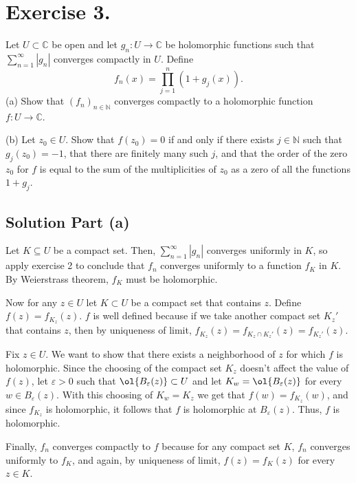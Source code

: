 
\section{Exercise 3.}

Let \(U \subset \mathbb{C}\) be open and let \(g_n : U \to \mathbb{C}\) be holomorphic functions such that \(\sum_{n=1}^{\infty} |g_n|\) converges compactly in \(U\). Define
\[
f_n(x) = \prod_{j=1}^{n} (1 + g_j(x)).
\]
(a) Show that \((f_n)_{n \in \mathbb{N}}\) converges compactly to a holomorphic function \(f : U \to \mathbb{C}\).

(b) Let \(z_0 \in U\). Show that \(f(z_0) = 0\) if and only if there exists \(j \in \mathbb{N}\) such that \(g_j(z_0) = -1\), that there are finitely many such \(j\), and that the order of the zero \(z_0\) for \(f\) is equal to the sum of the multiplicities of \(z_0\) as a zero of all the functions \(1 + g_j\).

\subsection*{Solution Part (a)}

Let $K \subseteq U$ be a compact set. Then, $\sum_{n = 1}^{\infty}|g_n|$ converges uniformly in $K$, so apply exercise 2 to conclude that $f_n$ converges uniformly to a function $f_K$ in $K$. By Weierstrass theorem, $f_K$ must be holomorphic.

Now for any $z \in U$ let $K \subset U$ be a compact set that contains $z$. Define $f(z) = f_{K_z}(z)$. $f$ is well defined because if we take another compact set $K_z'$ that contains $z$, then by uniqueness of limit, $f_{K_z}(z) = f_{K_z\cap K_z'}(z) = f_{K_z'}(z)$.

Fix $z \in U$. We want to show that there exists a neighborhood of $z$ for which $f$ is holomorphic. Since the choosing of the compact set $K_z$ doesn't affect the value of $f(z)$, let $\varepsilon > 0$ such that $\ol{B_{\varepsilon}(z)} \subset U$ and let $K_w = \ol{B_{\varepsilon }(z)}$ for every $w \in B_{\varepsilon}(z)$. With this choosing of $K_w = K_z$ we get that $f(w) = f_{K_z}(w)$, and since $f_{K_z}$ is holomorphic, it follows that $f$ is holomorphic at $B_\varepsilon(z)$. Thus, $f$ is holomorphic.

Finally, $f_n$ converges compactly to $f$ because for any compact set $K$, $f_n$ converges uniformly to $f_K$, and again, by uniqueness of limit, $f(z) = f_K(z)$ for every $z \in K$.

